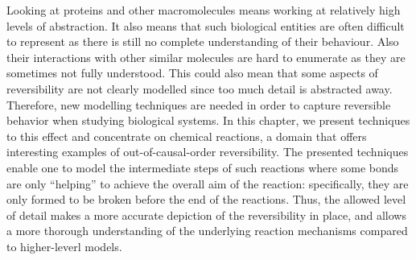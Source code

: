 \documentclass[runningheads]{llncs}
\begin{document}
Looking at proteins and other macromolecules means working at relatively
high  levels  of  abstraction.   It  also  means  that  such  biological  entities  are  often  difficult  to  represent  as  there  is  still  no  complete  understanding  of  their
behaviour.  Also their interactions with other similar molecules are hard to enumerate as they are sometimes not fully understood. This could also mean that some aspects of reversibility are not clearly modelled since  too  much
detail is abstracted away. Therefore,  new modelling techniques are needed in order to capture reversible behavior when studying biological systems. In this chapter, we present techniques to this effect and concentrate on chemical reactions, a domain that offers
interesting examples of out-of-causal-order reversibility. %
The presented techniques enable one to model the intermediate steps of such reactions where some bonds are
only ``helping'' to achieve the overall aim of the reaction:  specifically, they are only formed to be
broken before the end of the reactions.  Thus, the allowed level of detail 
makes a more accurate depiction of the reversibility in place, and allows a more thorough understanding of the underlying reaction mechanisms 
compared to higher-leverl models.
\end{document}

